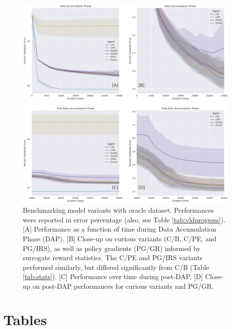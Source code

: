 \documentclass[utf8]{frontiersSCNS}
\begin{document}
\begin{figure}[bh!]
	\begin{center}
	\includegraphics[width=18cm]{tsplot-join-vldprogress-v1}
	\end{center}
	\caption{Benchmarking model variants with oracle dataset. Performances were reported in error percentage (also, see Table \ref{tab:vldprogress}). [A] Performance as a function of time during Data Accumulation Phase (DAP). [B] Close-up on curious variants (C/B, C/PE, and PG/IRS), as well as policy gradients (PG/GR) informed by surrogate reward statistics. The C/PE and PG/IRS variants performed similarly, but differed significantly from C/B (Table \ref{tab:stats}). [C] Performance over time during post-DAP. [D] Close-up on post-DAP performances for curious variants and PG/GR.}
	\label{fig:vldprogress}
\end{figure}


\section*{Tables}
\end{document}
